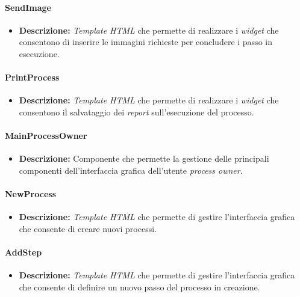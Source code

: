 \paragraph{SendImage}
\begin{itemize}
\item \textbf{Descrizione:} \textit{Template HTML} che permette di realizzare i \textit{widget} che consentono di inserire le immagini richieste per concludere i passo in esecuzione.
\end{itemize}

\paragraph{PrintProcess}
\begin{itemize}
\item \textbf{Descrizione:} \textit{Template HTML} che permette di realizzare i \textit{widget} che consentono il salvataggio dei \textit{report} sull'esecuzione del processo.
\end{itemize}

\paragraph{MainProcessOwner}
\begin{itemize}
\item \textbf{Descrizione:} Componente che permette la gestione delle principali componenti dell'interfaccia grafica dell'utente \textit{process owner}.
\end{itemize}

\paragraph{NewProcess}
\begin{itemize}
\item \textbf{Descrizione:} \textit{Template HTML} che permette di gestire l'interfaccia grafica che consente di creare nuovi processi.
\end{itemize}

\paragraph{AddStep}
\begin{itemize}
\item \textbf{Descrizione:} \textit{Template HTML} che permette di gestire l'interfaccia grafica che consente di definire un nuovo passo del processo in creazione.
\end{itemize}

